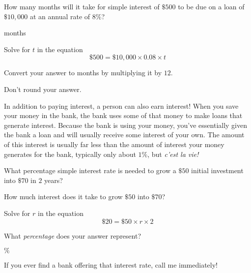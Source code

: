\documentclass{ximera}
\begin{document}
\begin{question}
How many months will it take for simple interest of $\$500$ to be due on a loan of $\$10,000$ at an annual rate of $8\%$? 	


 months
\begin{hint}
Solve for $t$ in the equation
\begin{equation*}\$500=\$10,000\times 0.08\times t\end{equation*}
\end{hint}
\begin{hint}
Convert your answer to months by multiplying it by $12$.
\end{hint}
\begin{hint}
Don't round your answer.
\end{hint}
	

\end{question}

In addition to paying interest, a person can also earn interest! When you save your money in the bank, the bank uses some of that money to make loans that generate interest. Because the bank is using your money, you've essentially given the bank a loan and will usually receive some interest of your own. The amount of this interest is usually far less than the amount of interest your money generates for the bank, typically only about $1\%$, but \emph{c'est la vie!}

\begin{question}
What percentage simple interest rate is needed to grow a $\$50$ initial investment into $\$70$ in $2$ years?


\begin{hint}
How much interest does it take to grow $\$50$ into $\$70$?
\end{hint}
\begin{hint}
Solve for $r$ in the equation
\begin{equation*}\$20=\$50\times r\times 2\end{equation*}
\end{hint}
\begin{hint}
What \emph{percentage} does your answer represent?
\end{hint}
$\%$


If you ever find a bank offering that interest rate, call me immediately!
\end{question}
\end{document}
